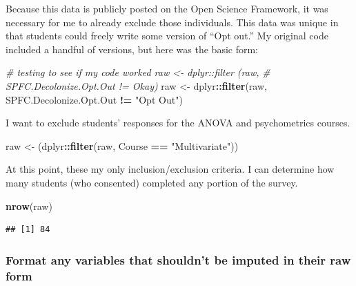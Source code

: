 \documentclass[
  11pt,
]{book}
\newenvironment{Shaded}{\begin{snugshade}}{\end{snugshade}}
\newcommand{\CommentTok}[1]{\textcolor[rgb]{0.37,0.37,0.37}{\textit{#1}}}
\newcommand{\FunctionTok}[1]{\textcolor[rgb]{0.27,0.27,0.27}{\textbf{#1}}}
\newcommand{\NormalTok}[1]{#1}
\newcommand{\OtherTok}[1]{\textcolor[rgb]{0.37,0.37,0.37}{#1}}
\newcommand{\SpecialCharTok}[1]{\textcolor[rgb]{0.43,0.43,0.43}{\textbf{#1}}}
\newcommand{\StringTok}[1]{\textcolor[rgb]{0.5,0.5,0.5}{#1}}
\begin{document}
Because this data is publicly posted on the Open Science Framework, it was necessary for me to already exclude those individuals. This data was unique in that students could freely write some version of ``Opt out.'' My original code included a handful of versions, but here was the basic form:

\begin{Shaded}
\begin{Highlighting}[]
\CommentTok{\# testing to see if my code worked raw \textless{}{-} dplyr::filter (raw,}
\CommentTok{\# SPFC.Decolonize.Opt.Out != \textquotesingle{}Okay\textquotesingle{})}
\NormalTok{raw }\OtherTok{\textless{}{-}}\NormalTok{ dplyr}\SpecialCharTok{::}\FunctionTok{filter}\NormalTok{(raw, SPFC.Decolonize.Opt.Out }\SpecialCharTok{!=} \StringTok{"Opt Out"}\NormalTok{)}
\end{Highlighting}
\end{Shaded}

I want to exclude students' responses for the ANOVA and psychometrics courses.

\begin{Shaded}
\begin{Highlighting}[]
\NormalTok{raw }\OtherTok{\textless{}{-}}\NormalTok{ (dplyr}\SpecialCharTok{::}\FunctionTok{filter}\NormalTok{(raw, Course }\SpecialCharTok{==} \StringTok{"Multivariate"}\NormalTok{))}
\end{Highlighting}
\end{Shaded}

At this point, these my only inclusion/exclusion criteria. I can determine how many students (who consented) completed any portion of the survey.

\begin{Shaded}
\begin{Highlighting}[]
\FunctionTok{nrow}\NormalTok{(raw)}
\end{Highlighting}
\end{Shaded}

\begin{verbatim}
## [1] 84
\end{verbatim}

\hypertarget{format-any-variables-that-shouldnt-be-imputed-in-their-raw-form}{%
\subsubsection{Format any variables that shouldn't be imputed in their raw form}\label{format-any-variables-that-shouldnt-be-imputed-in-their-raw-form}}
\end{document}
